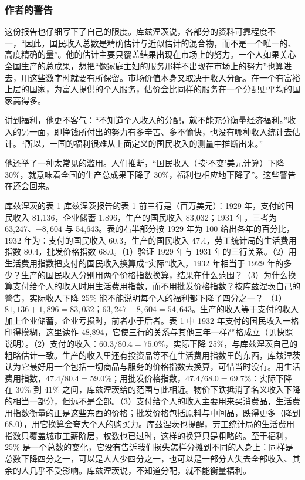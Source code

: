 \subsubsection{作者的警告}
这份报告也仔细写下了自己的限度。库兹涅茨说，各部分的资料可靠程度不一，“因此，国民收入总数是精确估计与近似估计的混合物，而不是一个唯一的、高度精确的量”\cite{kuznets1934}。他的估计主要只覆盖结果出现在市场上的努力。一个人如果关心全国生产的总成果，想把“像家庭主妇的服务那样不出现在市场上的努力”也算进去，用这些数字时就要有所保留\cite{kuznets1934}。市场价值本身又取决于收入分配。在一个有富裕上层的国家，为富人提供的个人服务，估价会比同样的服务在一个分配更平均的国家高得多\cite{kuznets1934}。

讲到福利，他更不客气：“不知道个人收入的分配，就不能充分衡量经济福利。”收入的另一面，即挣钱所付出的努力有多辛苦、多不愉快，也没有哪种收入统计去估计。“所以，一国的福利很难从上面定义的国民收入的测量中推断出来。”\cite{kuznets1934}

他还举了一种太常见的滥用。人们推断，“国民收入（按‘不变’美元计算）下降 30\%，就意味着全国的生产总成果下降了 30\%，福利也相应地下降了”\cite{kuznets1934}。这些警告在还会回来。

\begin{example}{库兹涅茨的表 1}\label{ex:accounts-kuznets}
库兹涅茨报告的表 1 前三行是（百万美元）：1929 年，支付的国民收入 81,136，企业储蓄 1,896，生产的国民收入 83,032；1931 年，三者为 63,247、$-8{,}604$ 与 54,643。表的右半部分按 1929 年为 100 给出各年的百分比，1932 年为：支付的国民收入 60.3，生产的国民收入 47.4，劳工统计局的生活费用指数 80.4，批发价格指数 68.0\cite{kuznets1934}。（1）验证 1929 年与 1931 年的三行关系。（2）用生活费用指数把支付的国民收入换算成“实际”收入，1932 年相当于 1929 年的多少？生产的国民收入分别用两个价格指数换算，结果在什么范围？（3）为什么换算支付给个人的收入时用生活费用指数，而不用批发价格指数？按库兹涅茨自己的警告，实际收入下降 25\% 能不能说明每个人的福利都下降了四分之一？
\solution （1）$81{,}136+1{,}896=83{,}032$；$63{,}247-8{,}604=54{,}643$。生产的收入等于支付的收入加上企业储蓄，企业亏损时，前者小于后者。表 1 中 1932 年支付的国民收入一格印得模糊，这里读作 48,894，它使三行的关系与其他三年一样严格成立（见快照说明）。（2）支付的收入：$60.3/80.4=75.0\%$，实际下降 25\%，与库兹涅茨自己的粗略估计一致。生产的收入里还有投资品等不在生活费用指数里的东西，库兹涅茨认为它最好用一个包括一切商品与服务的价格指数去换算，可惜当时没有\cite{kuznets1934}。用生活费用指数，$47.4/80.4=59.0\%$；用批发价格指数，$47.4/68.0=69.7\%$：实际下降在 30\% 到 41\% 之间，库兹涅茨给的范围与此相近。物价下跌抵消了名义收入下降的相当一部分，但远不是全部。（3）支付给个人的收入主要用来买消费品，生活费用指数衡量的正是这些东西的价格；批发价格包括原料与中间品，跌得更多（降到 68.0），用它换算会夸大个人的购买力。库兹涅茨也提醒，劳工统计局的生活费用指数只覆盖城市工薪阶层，权数也已过时，这样的换算只是粗略的。至于福利，25\% 是一个总数的变化，它没有告诉我们损失怎样分摊到不同的人身上：同样是总数下降四分之一，可以是人人少四分之一，也可以是一部分人失去全部收入、其余的人几乎不受影响。库兹涅茨说，不知道分配，就不能衡量福利。
\end{example}

